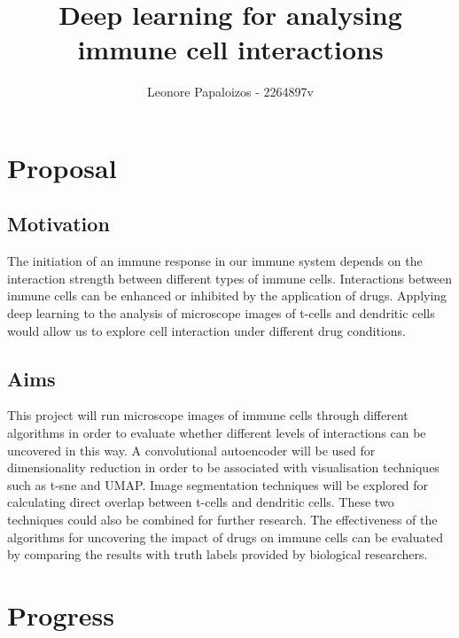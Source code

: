 \documentclass[11pt]{article}
\title{Deep learning for analysing immune cell interactions}
\author{ Leonore Papaloizos - 2264897v }
\begin{document}
    \maketitle


\section{Proposal}\label{proposal}

\subsection{Motivation}\label{motivation}

The initiation of an immune response in our immune system depends on the interaction strength between different types of immune cells. Interactions between immune cells can be enhanced or inhibited by the application of drugs.  Applying deep learning to the analysis of microscope images of t-cells and dendritic cells would allow us to explore cell interaction under different drug conditions.

\subsection{Aims}\label{aims}

This project will run microscope images of immune cells through different algorithms in order to evaluate whether different levels of interactions can be uncovered in this way. A convolutional autoencoder will be used for dimensionality reduction in order to be associated with visualisation techniques such as t-sne and UMAP. Image segmentation techniques will be explored for calculating direct overlap between t-cells and dendritic cells. These two techniques could also be combined for further research. The effectiveness of the algorithms for uncovering the impact of drugs on immune cells can be evaluated by comparing the results with truth labels provided by biological researchers.

\section{Progress}\label{progress}
\end{document}
